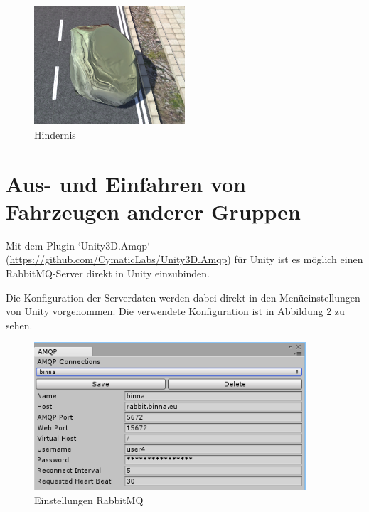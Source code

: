 \begin{figure}[H]
\begin{center}
\includegraphics[width=0.5\textwidth]{BilderAllgemein/rock.PNG}
\end{center}
	\caption{Hindernis}
	\label{img:hindernis}
\end{figure}

\section{Aus- und Einfahren von Fahrzeugen anderer Gruppen}
\label{Aus- und Einfahren von Fahrzeugen anderer Gruppen}

Mit dem Plugin `Unity3D.Amqp` (\url{https://github.com/CymaticLabs/Unity3D.Amqp}) für Unity ist es möglich einen RabbitMQ-Server direkt in Unity einzubinden.

Die Konfiguration der Serverdaten werden dabei direkt in den Menüeinstellungen von Unity vorgenommen. Die verwendete Konfiguration ist in Abbildung \ref{img:rabbit} zu sehen.

\begin{figure}[H]
\begin{center}
	\includegraphics[width=0.9\textwidth]{BilderAllgemein/rabbitconfig.png}
\end{center}

	\caption{Einstellungen RabbitMQ}

	\label{img:rabbit}
\end{figure}

